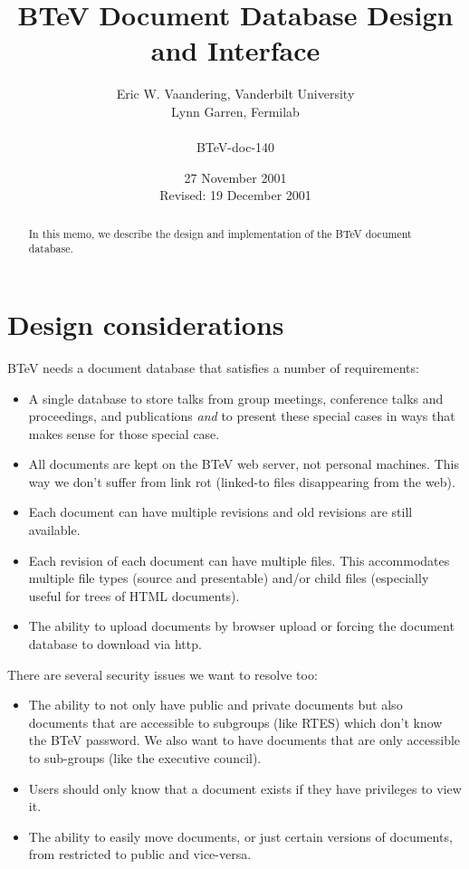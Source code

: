 \documentclass[12pt]{article}
\begin{document}
                                                 

\title{BTeV Document Database Design and Interface}

\author{
        Eric W. Vaandering, Vanderbilt University\\
        Lynn Garren, Fermilab\\
        \\
        {BTeV-doc-140}
       }
        

\date{27 November 2001 \\
      Revised: 19 December 2001}

\maketitle

\begin{abstract} 
In this memo, we describe the design and implementation of the BTeV document
database.
\end{abstract}

\section{Design considerations}

BTeV needs a document database that satisfies a number of requirements:
\begin{itemize}
\item{A single database to store talks from group meetings,
conference talks and proceedings, and publications \emph{and} to present these
special cases in ways that makes sense for those special case.}
\item{All documents are kept on the BTeV web server, not personal machines. 
This way we don't suffer from link rot (linked-to files disappearing from the web).}
\item{Each document can have multiple revisions and old revisions are still
available.}
\item{Each revision of each document can have multiple files. This accommodates
multiple file types (source and  presentable) and/or child files (especially
useful for trees of HTML  documents).}
\item{The ability to upload documents by browser upload or forcing the 
document database to download via http.}
\end{itemize}

There are several security issues we want to resolve too:
\begin{itemize}
\item{The ability to not only have public and private documents but also 
documents that are accessible to subgroups (like RTES) which don't know 
the BTeV password. We also want to have documents that are only 
accessible to sub-groups (like the executive council).}
\item{Users should only know that a document exists if they have 
privileges to view it.}
\item{The ability to easily move documents, or just certain versions of 
documents, from restricted to public and vice-versa.}
\end{itemize}
\end{document}
